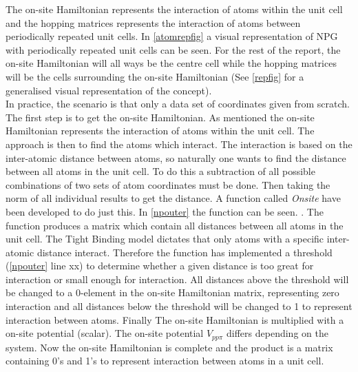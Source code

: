 The on-site Hamiltonian represents the interaction of atoms within the unit cell and the hopping matrices represents the interaction of atoms between periodically repeated unit cells. 
In \cref{atomrepfig} a visual representation of NPG with periodically repeated unit cells can be seen. For the rest of the report, the on-site Hamiltonian will all ways be the centre cell while the hopping matrices will be the cells surrounding the on-site Hamiltonian (See \cref{repfig} for a generalised visual representation of the concept). \\
In practice, the scenario is that only a data set of coordinates given from scratch. The first step is to get the on-site Hamiltonian. As mentioned the on-site Hamiltonian represents the interaction of atoms within the unit cell. The approach is then to find the atoms which interact. The interaction is based on the inter-atomic distance between atoms, so naturally one wants to find the distance between all atoms in the unit cell. To do this a subtraction of all possible combinations of two sets of atom coordinates must be done. Then taking the norm of all individual results to get the distance. A function called \textit{Onsite} have been developed to do just this. In \cref{npouter} the function can be seen.
. 
\vspace{-1\baselineskip}
\vspace{\baselineskip}
The function produces a matrix which contain all distances between all atoms in the unit cell. The Tight Binding model dictates that only atoms with a specific inter-atomic distance interact. Therefore the function has implemented a threshold (\cref{npouter} line xx) to determine whether a given distance is too great for interaction or small enough for interaction. All distances above the threshold will be changed to a 0-element in the on-site Hamiltonian matrix, representing zero interaction and all distances below the threshold will be changed to 1 to represent interaction between atoms. Finally The on-site Hamiltonian is multiplied with a on-site potential (scalar). The on-site potential \(V_{pp\pi}\) differs depending on the system. Now the on-site Hamiltonian is complete and the product is a matrix containing 0's and 1's to represent interaction between atoms in a unit cell. \\
